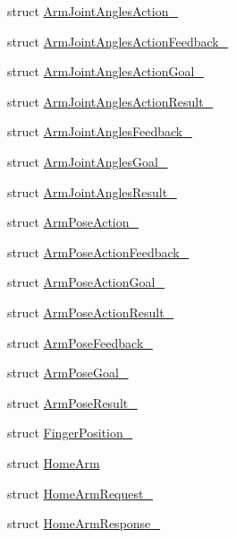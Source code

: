 \begin{DoxyCompactItemize}
\item 
struct \hyperlink{structjaco__msgs_1_1ArmJointAnglesAction__}{Arm\+Joint\+Angles\+Action\+\_\+}
\item 
struct \hyperlink{structjaco__msgs_1_1ArmJointAnglesActionFeedback__}{Arm\+Joint\+Angles\+Action\+Feedback\+\_\+}
\item 
struct \hyperlink{structjaco__msgs_1_1ArmJointAnglesActionGoal__}{Arm\+Joint\+Angles\+Action\+Goal\+\_\+}
\item 
struct \hyperlink{structjaco__msgs_1_1ArmJointAnglesActionResult__}{Arm\+Joint\+Angles\+Action\+Result\+\_\+}
\item 
struct \hyperlink{structjaco__msgs_1_1ArmJointAnglesFeedback__}{Arm\+Joint\+Angles\+Feedback\+\_\+}
\item 
struct \hyperlink{structjaco__msgs_1_1ArmJointAnglesGoal__}{Arm\+Joint\+Angles\+Goal\+\_\+}
\item 
struct \hyperlink{structjaco__msgs_1_1ArmJointAnglesResult__}{Arm\+Joint\+Angles\+Result\+\_\+}
\item 
struct \hyperlink{structjaco__msgs_1_1ArmPoseAction__}{Arm\+Pose\+Action\+\_\+}
\item 
struct \hyperlink{structjaco__msgs_1_1ArmPoseActionFeedback__}{Arm\+Pose\+Action\+Feedback\+\_\+}
\item 
struct \hyperlink{structjaco__msgs_1_1ArmPoseActionGoal__}{Arm\+Pose\+Action\+Goal\+\_\+}
\item 
struct \hyperlink{structjaco__msgs_1_1ArmPoseActionResult__}{Arm\+Pose\+Action\+Result\+\_\+}
\item 
struct \hyperlink{structjaco__msgs_1_1ArmPoseFeedback__}{Arm\+Pose\+Feedback\+\_\+}
\item 
struct \hyperlink{structjaco__msgs_1_1ArmPoseGoal__}{Arm\+Pose\+Goal\+\_\+}
\item 
struct \hyperlink{structjaco__msgs_1_1ArmPoseResult__}{Arm\+Pose\+Result\+\_\+}
\item 
struct \hyperlink{structjaco__msgs_1_1FingerPosition__}{Finger\+Position\+\_\+}
\item 
struct \hyperlink{namespacejaco__msgs_d2/d3e/structjaco__msgs_1_1HomeArm}{Home\+Arm}
\item 
struct \hyperlink{structjaco__msgs_1_1HomeArmRequest__}{Home\+Arm\+Request\+\_\+}
\item 
struct \hyperlink{structjaco__msgs_1_1HomeArmResponse__}{Home\+Arm\+Response\+\_\+}
\item 

\end{DoxyCompactItemize}
